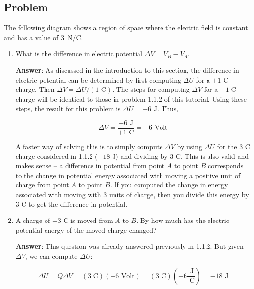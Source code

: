 \documentclass{article}
\begin{document}
\newpage

\subsection{Problem}

The following diagram shows a region of space where the electric field is constant and has a value of $3$~N/C. 



\begin{enumerate}

  \item What is the difference in electric potential $\Delta V = V_B-V_A$.

        \ifsolutions
        {\bf Answer}: As discussed in the introduction to this section, the difference in electric potential can be determined by first computing $\Delta U$ for a $+1\text{ C}$ charge. Then $\Delta V = \Delta U/(1\text{ C})$. The steps for computing $\Delta V$ for a $+1\text{ C}$ charge will be identical to those in problem 1.1.2 of this tutorial. Using these steps, the result for this problem is $\Delta U=-6\text{ J}$. Thus,

        $$\Delta V = \frac{-6\text{ J}}{+1\text{ C}}= -6\text{ Volt}$$

        A faster way of solving this is to simply compute $\Delta V$ by using $\Delta U$ for the $3\text{ C}$ charge considered in 1.1.2 ($-18\text{ J}$) and dividing by $3\text{ C}$. This is also valid and makes sense -- a difference in potential from point $A$ to point $B$ corresponds to the change in potential energy associated with moving a positive unit of charge from point $A$ to point $B$. If you computed the change in energy associated with moving with 3 units of charge, then you divide this energy by $3\text{ C}$ to get the difference in potential.
        \else

        \vskip 48pt
        \fi

  \item A charge of $+3\text{ C}$ is moved from $A$ to $B$. By how much has the electric potential energy of the moved charge changed?

        \ifsolutions
        {\bf Answer}: This question was already answered previously in 1.1.2. But given $\Delta V$, we can compute $\Delta U$:

        $$\Delta U = Q\Delta V=(3\text{ C})(-6\text{ Volt})=(3\text{ C})\left(-6\frac{\text{ J}}{ \text{ C}}\right)=-18\text{ J}$$
        \else


\end{enumerate}
\end{document}
